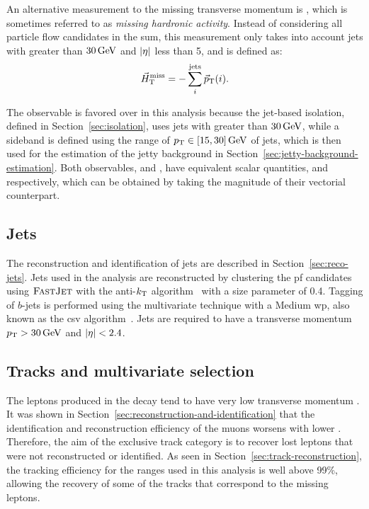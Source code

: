 An alternative measurement to the missing transverse momentum is \htvecmiss, which is sometimes referred to as \emph{missing hardronic activity}. Instead of considering all particle flow candidates in the sum, this measurement only takes into account jets with \pt greater than $30\,\text{Ge\hspace{-.08em}V}$ and $\lvert \eta \rvert$ less than 5, and is defined as:
\begin{equation}
\vec{H}_{\text{T}}^{\text{miss}} = -\sum_i^{\mathrm{jets}} {\vec p}_{\mathrm{T}}(i).
\end{equation}

The observable \htvecmiss is favored over \VEtmiss in this analysis because the jet-based isolation, defined in Section~\ref{sec:isolation}, uses jets with \pt greater than $30\,\text{Ge\hspace{-.08em}V}$, while a sideband is defined using the range of $p_{\mathrm{T}}\in [15,30]\,\text{Ge\hspace{-.08em}V}$ of jets, which is then used for the estimation of the jetty background in Section~\ref{sec:jetty-background-estimation}. Both observables, \VEtmiss and \htvecmiss, have equivalent scalar quantities, \MET and \mht respectively, which can be obtained by taking the magnitude of their vectorial counterpart.

\subsection{Jets}
\label{subsec:jets}

The reconstruction and identification of jets are described in Section~\ref{sec:reco-jets}. Jets used in the analysis are reconstructed by clustering the \gls{pf} candidates using ${\textsc{FastJet}}$ with the anti-$k_{\mathrm{T}}$ algorithm~\cite{Cacciari_2008_antikt} with a size parameter of 0.4. Tagging of $b$-jets is performed using the multivariate technique \DEEPCSV with a Medium \gls{wp}, also known as the \gls{csv} algorithm~\cite{BTV-16-002}. Jets are required to have a transverse momentum $p_{\mathrm{T}}>30\,\text{Ge\hspace{-.08em}V}$ and $\lvert \eta \rvert<2.4$.

\clearpage
\subsection{Tracks and multivariate selection }
\label{sec:track-bdt}

The leptons \ellell produced in the decay \neuttdecay tend to have very low transverse momentum \pt. It was shown in Section~\ref{sec:reconstruction-and-identification} that the identification and reconstruction efficiency of the muons worsens with lower \pt. Therefore, the aim of the exclusive track category is to recover lost leptons that were not reconstructed or identified. As seen in Section~\ref{sec:track-reconstruction}, the tracking efficiency for the \pt ranges used in this analysis is well above 99\%, allowing the recovery of some of the  tracks that correspond to the missing leptons.

